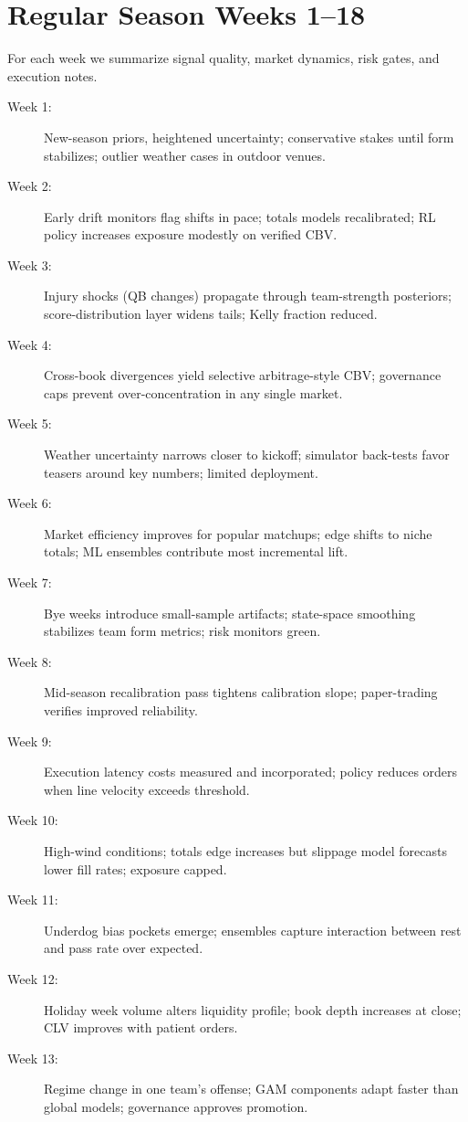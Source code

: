 \section{Regular Season Weeks 1--18}\label{app:cases-weeks}
For each week we summarize signal quality, market dynamics, risk gates, and execution notes.
\begin{description}
  \item[Week 1:] New-season priors, heightened uncertainty; conservative stakes until form stabilizes; outlier weather cases in outdoor venues.
  \item[Week 2:] Early drift monitors flag shifts in pace; totals models recalibrated; RL policy increases exposure modestly on verified CBV.
  \item[Week 3:] Injury shocks (QB changes) propagate through team-strength posteriors; score-distribution layer widens tails; Kelly fraction reduced.
  \item[Week 4:] Cross-book divergences yield selective arbitrage-style CBV; governance caps prevent over-concentration in any single market.
  \item[Week 5:] Weather uncertainty narrows closer to kickoff; simulator back-tests favor teasers around key numbers; limited deployment.
  \item[Week 6:] Market efficiency improves for popular matchups; edge shifts to niche totals; ML ensembles contribute most incremental lift.
  \item[Week 7:] Bye weeks introduce small-sample artifacts; state-space smoothing stabilizes team form metrics; risk monitors green.
  \item[Week 8:] Mid-season recalibration pass tightens calibration slope; paper-trading verifies improved reliability.
  \item[Week 9:] Execution latency costs measured and incorporated; policy reduces orders when line velocity exceeds threshold.
  \item[Week 10:] High-wind conditions; totals edge increases but slippage model forecasts lower fill rates; exposure capped.
  \item[Week 11:] Underdog bias pockets emerge; ensembles capture interaction between rest and pass rate over expected.
  \item[Week 12:] Holiday week volume alters liquidity profile; book depth increases at close; CLV improves with patient orders.
  \item[Week 13:] Regime change in one team's offense; GAM components adapt faster than global models; governance approves promotion.

\end{description}
